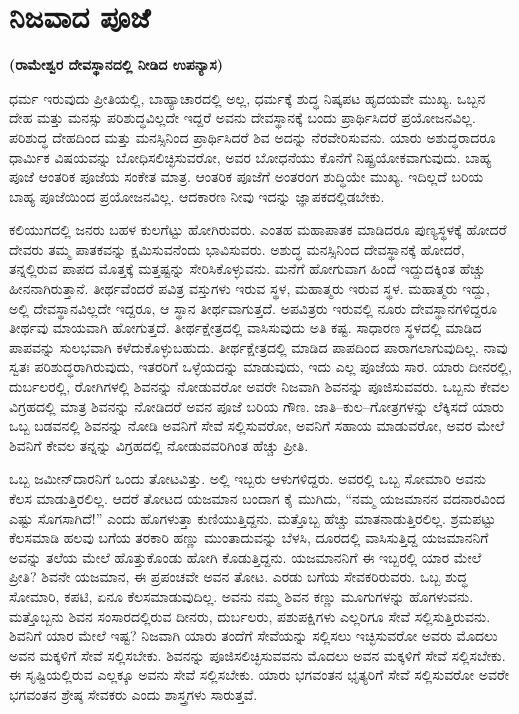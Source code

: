 
\chapter{ನಿಜವಾದ ಪೂಜೆ}

\begin{center}
\textbf{(ರಾಮೇಶ್ವರ ದೇವಸ್ಥಾನದಲ್ಲಿ ನೀಡಿದ ಉಪನ್ಯಾಸ)}
\end{center}

ಧರ್ಮ ಇರುವುದು ಪ್ರೀತಿಯಲ್ಲಿ, ಬಾಹ್ಯಾಚಾರದಲ್ಲಿ ಅಲ್ಲ, ಧರ್ಮಕ್ಕೆ ಶುದ್ಧ ನಿಷ್ಕಪಟ ಹೃದಯವೇ ಮುಖ್ಯ. ಒಬ್ಬನ ದೇಹ ಮತ್ತು ಮನಸ್ಸು ಪರಿಶುದ್ಧವಿಲ್ಲದೇ ಇದ್ದರೆ ಅವನು ದೇವಸ್ಥಾನಕ್ಕೆ ಬಂದು ಪ್ರಾರ್ಥಿಸಿದರೆ ಪ್ರಯೋಜನವಿಲ್ಲ. ಪರಿಶುದ್ಧ ದೇಹದಿಂದ ಮತ್ತು ಮನಸ್ಸಿನಿಂದ ಪ್ರಾರ್ಥಿಸಿದರೆ ಶಿವ ಅದನ್ನು ನೆರವೇರಿಸುವನು. ಯಾರು ಅಶುದ್ಧರಾದರೂ ಧಾರ್ಮಿಕ ವಿಷಯವನ್ನು ಬೋಧಿಸಲಿಚ್ಛಿಸುವರೋ, ಅವರ ಬೋಧನೆಯು ಕೊನೆಗೆ ನಿಷ್ಪ್ರಯೋಕವಾಗುವುದು. ಬಾಹ್ಯ ಪೂಜೆ ಆಂತರಿಕ ಪೂಜೆಯ ಸಂಕೇತ ಮಾತ್ರ. ಆಂತರಿಕ ಪೂಜೆಗೆ ಅಂತರಂಗ ಶುದ್ಧಿಯೇ ಮುಖ್ಯ. ಇದಿಲ್ಲದೆ ಬರಿಯ ಬಾಹ್ಯ ಪೂಜೆಯಿಂದ ಪ್ರಯೋಜನವಿಲ್ಲ. ಆದಕಾರಣ ನೀವು ಇದನ್ನು ಜ್ಞಾಪಕದಲ್ಲಿಡಬೇಕು. 

ಕಲಿಯುಗದಲ್ಲಿ ಜನರು ಬಹಳ ಕುಲಗೆಟ್ಟು ಹೋಗಿರುವರು. ಎಂತಹ ಮಹಾಪಾತಕ ಮಾಡಿದರೂ ಪುಣ್ಯಸ್ಥಳಕ್ಕೆ ಹೋದರೆ ದೇವರು ತಮ್ಮ ಪಾತಕವನ್ನು ಕ್ಷಮಿಸುವನೆಂದು ಭಾವಿಸುವರು. ಅಶುದ್ಧ ಮನಸ್ಸಿನಿಂದ ದೇವಸ್ಥಾನಕ್ಕೆ ಹೋದರೆ, ತನ್ನಲ್ಲಿರುವ ಪಾಪದ ಮೊತ್ತಕ್ಕೆ ಮತ್ತಷ್ಟನ್ನು ಸೇರಿಸಿಕೊಳ್ಳುವನು. ಮನೆಗೆ ಹೋಗುವಾಗ ಹಿಂದೆ ಇದ್ದುದಕ್ಕಿಂತ ಹೆಚ್ಚು ಹೀನನಾಗಿರುತ್ತಾನೆ. ತೀರ್ಥವೆಂದರೆ ಪವಿತ್ರ ವಸ್ತುಗಳು ಇರುವ ಸ್ಥಳ, ಮಹಾತ್ಮರು ಇರುವ ಸ್ಥಳ. ಮಹಾತ್ಮರು ಇದ್ದು, ಅಲ್ಲಿ ದೇವಸ್ಥಾನವಿಲ್ಲದೇ ಇದ್ದರೂ, ಆ ಸ್ಥಾನ ತೀರ್ಥವಾಗುತ್ತದೆ. ಅಪವಿತ್ರರು ಇರುವಲ್ಲಿ ನೂರು ದೇವಸ್ಥಾನಗಳಿದ್ದರೂ ತೀರ್ಥವು ಮಾಯವಾಗಿ ಹೋಗುತ್ತದೆ. ತೀರ್ಥಕ್ಷೇತ್ರದಲ್ಲಿ ವಾಸಿಸುವುದು ಅತಿ ಕಷ್ಟ. ಸಾಧಾರಣ ಸ್ಥಳದಲ್ಲಿ ಮಾಡಿದ ಪಾಪವನ್ನು ಸುಲಭವಾಗಿ ಕಳೆದುಕೊಳ್ಳುಬಹುದು. ತೀರ್ಥಕ್ಷೇತ್ರದಲ್ಲಿ ಮಾಡಿದ ಪಾಪದಿಂದ ಪಾರಾಗಲಾಗುವುದಿಲ್ಲ. ನಾವು ಸ್ವತಃ ಪರಿಶುದ್ಧರಾಗಿರುವುದು, ಇತರರಿಗೆ ಒಳ್ಳೆಯದನ್ನು ಮಾಡುವುದು, ಇದು ಎಲ್ಲ ಪೂಜೆಯ ಸಾರ. ಯಾರು ದೀನರಲ್ಲಿ, ದುರ್ಬಲರಲ್ಲಿ, ರೋಗಿಗಳಲ್ಲಿ ಶಿವನನ್ನು ನೋಡುವರೋ ಅವರೇ ನಿಜವಾಗಿ ಶಿವನನ್ನು ಪೂಜಿಸುವವರು. ಒಬ್ಬನು ಕೇವಲ ವಿಗ್ರಹದಲ್ಲಿ ಮಾತ್ರ ಶಿವನನ್ನು ನೋಡಿದರೆ ಅವನ ಪೂಜೆ ಬರಿಯ ಗೌಣ. ಜಾತಿ–ಕುಲ–ಗೋತ್ರಗಳನ್ನು ಲೆಕ್ಕಿಸದೆ ಯಾರು ಒಬ್ಬ ಬಡವನಲ್ಲಿ ಶಿವನನ್ನು ನೋಡಿ ಅವನಿಗೆ ಸೇವೆ ಸಲ್ಲಿಸುವರೋ, ಅವನಿಗೆ ಸಹಾಯ ಮಾಡುವರೋ, ಅವರ ಮೇಲೆ ಶಿವನಿಗೆ ಕೇವಲ ತನ್ನನ್ನು ವಿಗ್ರಹದಲ್ಲಿ ನೋಡುವವರಿಗಿಂತ ಹೆಚ್ಚು ಪ್ರೀತಿ. 

ಒಬ್ಬ ಜಮೀನ್​ದಾರನಿಗೆ ಒಂದು ತೋಟವಿತ್ತು. ಅಲ್ಲಿ ಇಬ್ಬರು ಆಳುಗಳಿದ್ದರು. ಅವರಲ್ಲಿ ಒಬ್ಬ ಸೋಮಾರಿ ಅವನು ಕೆಲಸ ಮಾಡುತ್ತಿರಲಿಲ್ಲ. ಆದರೆ ತೋಟದ ಯಜಮಾನ ಬಂದಾಗ ಕೈ ಮುಗಿದು, “ನಮ್ಮ ಯಜಮಾನನ ವದನಾರವಿಂದ ಎಷ್ಟು ಸೊಗಸಾಗಿದೆ!” ಎಂದು ಹೊಗಳುತ್ತಾ ಕುಣಿಯುತ್ತಿದ್ದನು. ಮತ್ತೊಬ್ಬ ಹೆಚ್ಚು ಮಾತನಾಡುತ್ತಿರಲಿಲ್ಲ. ಶ್ರಮಪಟ್ಟು ಕೆಲಸಮಾಡಿ ಹಲವು ಬಗೆಯ ತರಕಾರಿ ಹಣ್ಣು ಮುಂತಾದುವನ್ನು ಬೆಳಸಿ, ದೂರದಲ್ಲಿ ವಾಸಿಸುತ್ತಿದ್ದ ಯಜಮಾನನಿಗೆ ಅವನ್ನು ತಲೆಯ ಮೇಲೆ ಹೊತ್ತುಕೊಂಡು ಹೋಗಿ ಕೊಡುತ್ತಿದ್ದನು. ಯಜಮಾನನಿಗೆ ಈ ಇಬ್ಬರಲ್ಲಿ ಯಾರ ಮೇಲೆ ಪ್ರೀತಿ? ಶಿವನೇ ಯಜಮಾನ, ಈ ಪ್ರಪಂಚವೇ ಅವನ ತೋಟ. ಎರಡು ಬಗೆಯ ಸೇವಕರಿರುವರು. ಒಬ್ಬ ಶುದ್ಧ ಸೋಮಾರಿ, ಕಪಟಿ, ಏನೂ ಕೆಲಸಮಾಡುವುದಿಲ್ಲ. ಅವನು ನಮ್ಮ ಶಿವನ ಕಣ್ಣು ಮೂಗುಗಳನ್ನು ಹೊಗಳುವನು. ಮತ್ತೊಬ್ಬನು ಶಿವನ ಸಂಸಾರದಲ್ಲಿರುವ ದೀನರು, ದುರ್ಬಲರು, ಪಶುಪಕ್ಷಿಗಳು ಎಲ್ಲರಿಗೂ ಸೇವೆ ಸಲ್ಲಿಸುತ್ತಿರುವನು. ಶಿವನಿಗೆ ಯಾರ ಮೇಲೆ ಇಷ್ಟ? ನಿಜವಾಗಿ ಯಾರು ತಂದೆಗೆ ಸೇವೆಯನ್ನು ಸಲ್ಲಿಸಲು ಇಚ್ಛಿಸುವರೋ ಅವರು ಮೊದಲು ಅವನ ಮಕ್ಕಳಿಗೆ ಸೇವೆ ಸಲ್ಲಿಸಬೇಕು. ಶಿವನನ್ನು ಪೂಜಿಸಲಿಚ್ಛಿಸುವವನು ಮೊದಲು ಅವನ ಮಕ್ಕಳಿಗೆ ಸೇವೆ ಸಲ್ಲಿಸಬೇಕು. ಈ ಸೃಷ್ಟಿಯಲ್ಲಿರುವ ಎಲ್ಲಕ್ಕೂ ಅವನು ಸೇವೆ ಸಲ್ಲಿಸಬೇಕು. ಯಾರು ಭಗವಂತನ ಭೃತ್ಯರಿಗೆ ಸೇವೆ ಸಲ್ಲಿಸುವರೋ ಅವರೇ ಭಗವಂತನ ಶ್ರೇಷ್ಠ ಸೇವಕರು ಎಂದು ಶಾಸ್ತ್ರಗಳು ಸಾರುತ್ತವೆ. 

